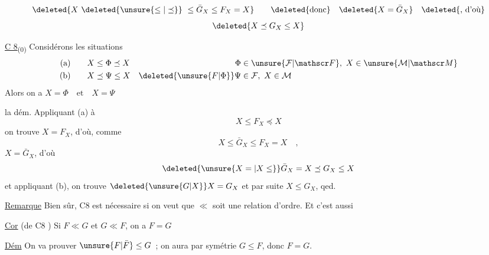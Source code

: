 
\[
\deleted{X\ \deleted{\unsure{\leq|\preceq}}\ \leq\bar G_X\leq F_X=X}
\qquad\text{\deleted{donc}}\quad\deleted{X=\bar G_X}\quad\text{\deleted{, d'où}}
\]
\[
\deleted{X\preceq G_X\leq X}
\]


\noindent\llap{\smash{\rule[-4.9\baselineskip]{.35pt}{5.6\baselineskip}\hspace{.20em}\rule[-4.9\baselineskip]{.35pt}{5.6\baselineskip}}\hspace{.6em}}\uline{C 8}\textsubscript{(0)} Considérons les situations
\[
\begin{aligned}
\text{(a)}\qquad &X\leq\Phi\preceq X & \Phi&\in\unsure{\mathcal F|\mathscr F},\ X\in\unsure{\mathcal M|\mathscr M}\\
\text{(b)}\qquad &X\preceq\Psi\leq X & \deleted{\unsure{F|\Phi}}\Psi&\in\mathcal F,\ X\in\mathcal M
\end{aligned}
\]
Alors on a $X=\Phi\quad\text{et}\quad X=\Psi$

 la dém. Appliquant (a) à
\[
X\leq F_X\preceq X
\]
on trouve $X=F_X$, d'où, comme
\[
X\leq\bar G_X\leq F_X=X\quad,
\]
$X=\bar G_X$, d'où
\[
\deleted{\unsure{X=|X\leq}}\bar G_X=X\preceq G_X\leq X
\]
et appliquant (b), on trouve $\deleted{\unsure{G|X}}X=G_X$ et par suite $X\leq G_X$, qed.

\uline{Remarque} Bien sûr, C8 est nécessaire si on veut que $\ll$ soit une relation d'ordre. Et c'est aussi \unsure{,:|;:|;}

\uline{Cor} (de C8 ) Si $F\ll G$ et $G\ll F$, on a $F=G$

\uline{Dém}  On va prouver $\unsure{F|\bar F}\leq G$\ ;  on aura par symétrie $G\leq F$, donc $F=G$.


